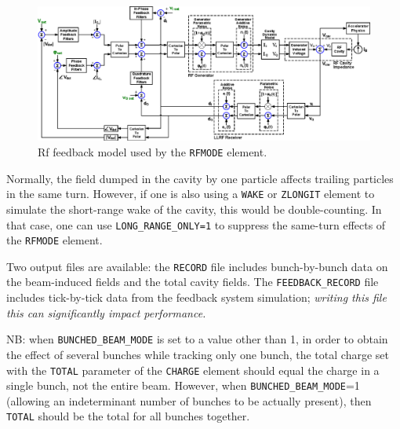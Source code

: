 \begin{figure}[htb]
\center
\includegraphics{rfFeedbackModel}
\caption{Rf feedback model used by the {\tt RFMODE} element.}
\label{fig:rfFeedbackModel}
\end{figure}

Normally, the field dumped in the cavity by one particle affects trailing particles in the same turn.
However, if one is also using a \verb|WAKE| or \verb|ZLONGIT| element to simulate the short-range wake of the cavity, this would be double-counting.
In that case, one can use \verb|LONG_RANGE_ONLY=1| to suppress the same-turn effects of the \verb|RFMODE| element.

Two output files are available: the \verb|RECORD| file includes bunch-by-bunch data on the beam-induced fields and the total cavity fields.
The \verb|FEEDBACK_RECORD| file includes tick-by-tick data from the feedback system simulation; {\em writing this file this can significantly impact performance.}

NB: when \verb|BUNCHED_BEAM_MODE| is set to a value other than 1, in order to obtain the effect of several bunches while tracking
only one bunch, the total charge set with the \verb|TOTAL| parameter of the \verb|CHARGE| element should equal the charge in
a single bunch, not the entire beam. However, when \verb|BUNCHED_BEAM_MODE|=1 (allowing an indeterminant number of bunches to be
actually present), then \verb|TOTAL| should be the total for all bunches together.
